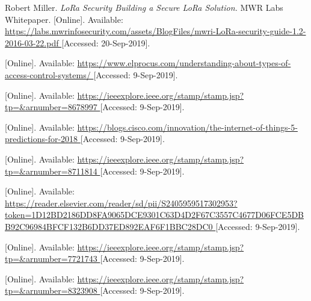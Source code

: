 \begin{thebibliography}{9}
Robert Miller.
\textit{
LoRa Security
Building a Secure LoRa Solution.
}
MWR Labs Whitepaper.
[Online]. Available:
\url{
https://labs.mwrinfosecurity.com/assets/BlogFiles/mwri-LoRa-security-guide-1.2-2016-03-22.pdf
}
[Accessed: 20-Sep-2019].






[Online]. Available:
\url{
https://www.elprocus.com/understanding-about-types-of-access-control-systems/
}
[Accessed: 9-Sep-2019].




[Online]. Available:
\url{
https://ieeexplore.ieee.org/stamp/stamp.jsp?tp=&arnumber=8678997
}
[Accessed: 9-Sep-2019].



[Online]. Available:
\url{
https://blogs.cisco.com/innovation/the-internet-of-things-5-predictions-for-2018
}
[Accessed: 9-Sep-2019].



[Online]. Available:
\url{
https://ieeexplore.ieee.org/stamp/stamp.jsp?tp=&arnumber=8711814
}
[Accessed: 9-Sep-2019].



[Online]. Available:
\url{
https://reader.elsevier.com/reader/sd/pii/S2405959517302953?token=1D12BD2186DD8FA9065DCE9301C63D4D2F67C3557C4677D06FCE5DBB92C96984BFCF132B6DD37ED892EAF6F1BBC28DC0
}
[Accessed: 9-Sep-2019].


[Online]. Available:
\url{
https://ieeexplore.ieee.org/stamp/stamp.jsp?tp=&arnumber=7721743
}
[Accessed: 9-Sep-2019].


[Online]. Available:
\url{
https://ieeexplore.ieee.org/stamp/stamp.jsp?tp=&arnumber=8323908
}
[Accessed: 9-Sep-2019].



\end{thebibliography}

